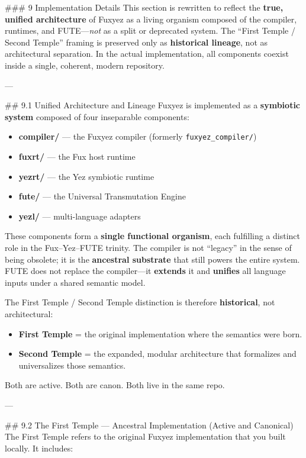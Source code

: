 \documentclass[12pt, a4paper]{book}
\begin{document}
    
    \#\#\# 9 Implementation Details  
This section is rewritten to reflect the \textbf{true, unified architecture} of Fuxyez as a living organism composed of the compiler, runtimes, and FUTE—\textit{not} as a split or deprecated system. The “First Temple / Second Temple” framing is preserved only as \textbf{historical lineage}, not as architectural separation. In the actual implementation, all components coexist inside a single, coherent, modern repository.

---

\#\# 9.1 Unified Architecture and Lineage  
Fuxyez is implemented as a \textbf{symbiotic system} composed of four inseparable components:

\begin{itemize}
  \item \textbf{compiler/} — the Fuxyez compiler (formerly \texttt{fuxyez\_compiler/})  
  \item \textbf{fuxrt/} — the Fux host runtime  
  \item \textbf{yezrt/} — the Yez symbiotic runtime  
  \item \textbf{fute/} — the Universal Transmutation Engine  
  \item \textbf{yezl/} — multi-language adapters  
\end{itemize}

These components form a \textbf{single functional organism}, each fulfilling a distinct role in the Fux–Yez–FUTE trinity. The compiler is not “legacy” in the sense of being obsolete; it is the \textbf{ancestral substrate} that still powers the entire system. FUTE does not replace the compiler—it \textbf{extends} it and \textbf{unifies} all language inputs under a shared semantic model.

The First Temple / Second Temple distinction is therefore \textbf{historical}, not architectural:

\begin{itemize}
  \item \textbf{First Temple} = the original implementation where the semantics were born.  
  \item \textbf{Second Temple} = the expanded, modular architecture that formalizes and universalizes those semantics.  
\end{itemize}

Both are active. Both are canon. Both live in the same repo.

---

\#\# 9.2 The First Temple — Ancestral Implementation (Active and Canonical)  
The First Temple refers to the original Fuxyez implementation that you built locally. It includes:
\end{document}
